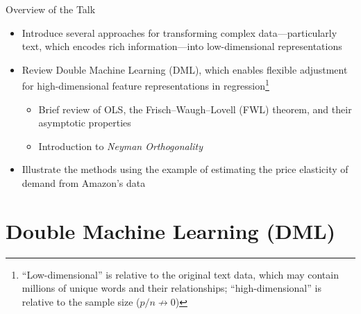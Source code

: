 \documentclass[aspectratio=1610,12pt,xcolor=dvipsnames]{beamer}
\begin{document}
\begin{frame}{Overview of the Talk}
\begin{itemize}
    \item Introduce several approaches for transforming complex data—particularly text, which encodes rich information—into low-dimensional representations   
    \item Review Double Machine Learning (DML), which enables flexible adjustment for high-dimensional feature representations in regression\footnote{\scriptsize ``Low-dimensional'' is relative to the original text data, which may contain millions of unique words and their relationships; ``high-dimensional'' is relative to the sample size ($p/n \not\rightarrow 0$)}
    \begin{itemize}
        \item Brief review of OLS, the Frisch--Waugh--Lovell (FWL) theorem, and their asymptotic properties
        \item Introduction to \textit{Neyman Orthogonality}
    \end{itemize}
    \item Illustrate the methods  using the example of estimating the price elasticity of demand from Amazon's data
\end{itemize}
\end{frame}

\section{Double Machine Learning (DML)}

\begin{frame}
  \sectionpage
\end{frame}
\end{document}
